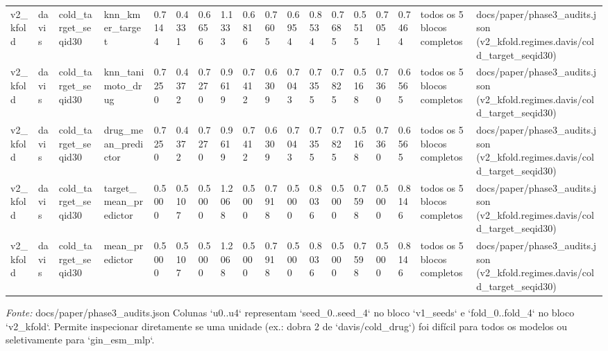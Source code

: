 \begin{table}[htbp]
\begin{tabular}{llllllllllllllllll}
v2\_kfold & davis & cold\_target\_seqid30 & knn\_kmer\_target & 0.7144 & 0.4331 & 0.6656 & 1.1333 & 0.6816 & 0.7605 & 0.6954 & 0.8534 & 0.7685 & 0.5515 & 0.7051 & 0.7464 & todos os 5 blocos completos & docs/paper/phase3\_audits.json (v2\_kfold.regimes.davis/cold\_target\_seqid30) \\
v2\_kfold & davis & cold\_target\_seqid30 & knn\_tanimoto\_drug & 0.7250 & 0.4372 & 0.7270 & 0.9619 & 0.7412 & 0.6309 & 0.7043 & 0.7355 & 0.7825 & 0.5168 & 0.7360 & 0.6565 & todos os 5 blocos completos & docs/paper/phase3\_audits.json (v2\_kfold.regimes.davis/cold\_target\_seqid30) \\
v2\_kfold & davis & cold\_target\_seqid30 & drug\_mean\_predictor & 0.7250 & 0.4372 & 0.7270 & 0.9619 & 0.7412 & 0.6309 & 0.7043 & 0.7355 & 0.7825 & 0.5168 & 0.7360 & 0.6565 & todos os 5 blocos completos & docs/paper/phase3\_audits.json (v2\_kfold.regimes.davis/cold\_target\_seqid30) \\
v2\_kfold & davis & cold\_target\_seqid30 & target\_mean\_predictor & 0.5000 & 0.5107 & 0.5000 & 1.2068 & 0.5000 & 0.7918 & 0.5000 & 0.8036 & 0.5000 & 0.7598 & 0.5000 & 0.8146 & todos os 5 blocos completos & docs/paper/phase3\_audits.json (v2\_kfold.regimes.davis/cold\_target\_seqid30) \\
v2\_kfold & davis & cold\_target\_seqid30 & mean\_predictor & 0.5000 & 0.5107 & 0.5000 & 1.2068 & 0.5000 & 0.7918 & 0.5000 & 0.8036 & 0.5000 & 0.7598 & 0.5000 & 0.8146 & todos os 5 blocos completos & docs/paper/phase3\_audits.json (v2\_kfold.regimes.davis/cold\_target\_seqid30) \\
\bottomrule
\end{tabular}
\begin{flushleft}
\footnotesize \textit{Fonte:} docs/paper/phase3\_audits.json Colunas `u0..u4` representam `seed\_0..seed\_4` no bloco `v1\_seeds` e `fold\_0..fold\_4` no bloco `v2\_kfold`. Permite inspecionar diretamente se uma unidade (ex.: dobra 2 de `davis/cold\_drug`) foi difícil para todos os modelos ou seletivamente para `gin\_esm\_mlp`.
\end{flushleft}
\end{table}
